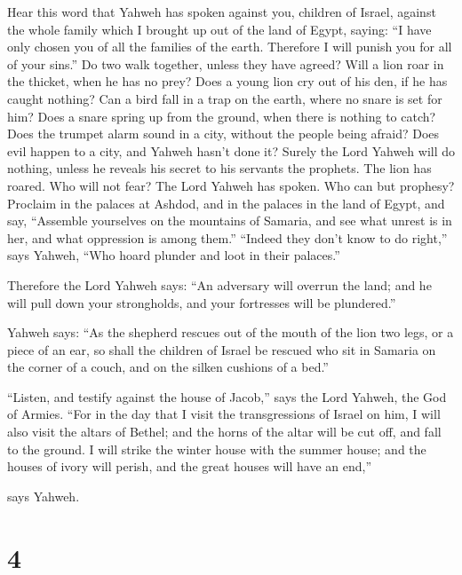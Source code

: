  Hear this word that Yahweh has spoken against you,
children of Israel, against the whole family which I brought up out of
the land of Egypt, saying:  ``I have only chosen you of
all the families of the earth. Therefore I will punish you for all of
your sins.''  Do two walk together, unless they have
agreed?  Will a lion roar in the thicket, when he has no
prey? Does a young lion cry out of his den, if he has caught nothing?
 Can a bird fall in a trap on the earth, where no snare is
set for him? Does a snare spring up from the ground, when there is
nothing to catch?  Does the trumpet alarm sound in a city,
without the people being afraid? Does evil happen to a city, and Yahweh
hasn't done it?  Surely the Lord Yahweh will do nothing,
unless he reveals his secret to his servants the prophets.
 The lion has roared. Who will not fear? The Lord Yahweh
has spoken. Who can but prophesy?  Proclaim in the palaces
at Ashdod, and in the palaces in the land of Egypt, and say, ``Assemble
yourselves on the mountains of Samaria, and see what unrest is in her,
and what oppression is among them.''  ``Indeed they don't
know to do right,'' says Yahweh, ``Who hoard plunder and loot in their
palaces.''

 Therefore the Lord Yahweh says: ``An adversary will
overrun the land; and he will pull down your strongholds, and your
fortresses will be plundered.''

 Yahweh says: ``As the shepherd rescues out of the mouth
of the lion two legs, or a piece of an ear, so shall the children of
Israel be rescued who sit in Samaria on the corner of a couch, and on
the silken cushions of a bed.''

 ``Listen, and testify against the house of Jacob,'' says
the Lord Yahweh, the God of Armies.  ``For in the day
that I visit the transgressions of Israel on him, I will also visit the
altars of Bethel; and the horns of the altar will be cut off, and fall
to the ground.  I will strike the winter house with the
summer house; and the houses of ivory will perish, and the great houses
will have an end,''

says Yahweh.

\hypertarget{section-3}{%
\section{4}\label{section-3}}

